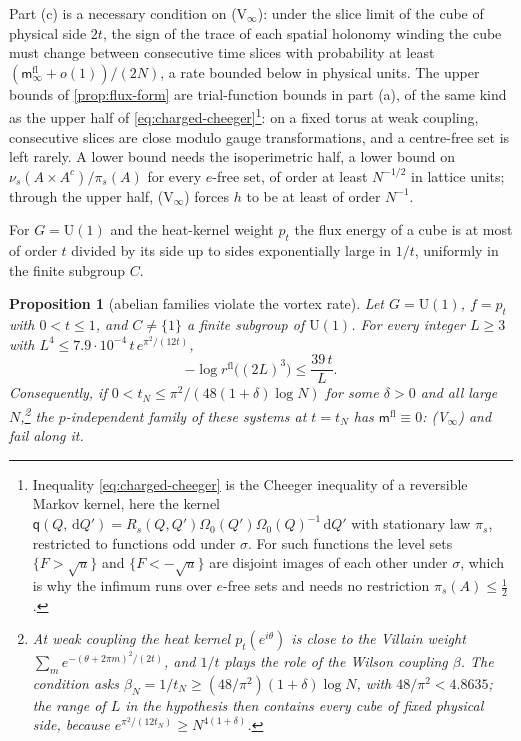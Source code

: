 \documentclass[11pt,a4paper]{amsart}
\newtheorem{proposition}[theorem]{Proposition}
\theoremstyle{definition}
\theoremstyle{remark}
\numberwithin{equation}{section}
\newcommand{\dd}{\,\mathrm{d}}             %
\newcommand{\U}{\mathrm{U}}                %
\newcommand{\cube}[1]{(2#1)^3}             %
\newcommand{\Omegazero}{\Omega_0}          %
\newcommand{\Mcirc}{\text{\upshape(M$^{\circ}$)}}   %
\begin{document}
Part (c) is a necessary condition on \textup{(V$_\infty$)}: under the slice limit of the cube of physical side $2t$, the sign of the trace of each spatial holonomy winding the cube must change between consecutive time slices with probability at least $(\mathsf m^{\mathrm{fl}}_\infty+o(1))/(2N)$, a rate bounded below in physical units. The upper bounds of \cref{prop:flux-form} are trial-function bounds in part (a), of the same kind as the upper half of \eqref{eq:charged-cheeger}\footnote{Inequality \eqref{eq:charged-cheeger} is the Cheeger inequality of a reversible Markov kernel, here the kernel $\mathsf q(Q,\dd Q')=R_s(Q,Q')\Omegazero(Q')\Omegazero(Q)^{-1}\dd Q'$ with stationary law $\pi_s$, restricted to functions odd under $\sigma$. For such functions the level sets $\{F>\sqrt u\}$ and $\{F<-\sqrt u\}$ are disjoint images of each other under $\sigma$, which is why the infimum runs over $e$-free sets and needs no restriction $\pi_s(A)\le\frac12$.}: on a fixed torus at weak coupling, consecutive slices are close modulo gauge transformations, and a centre-free set is left rarely. A lower bound needs the isoperimetric half, a lower bound on $\nu_s(A\times A^c)/\pi_s(A)$ for every $e$-free set, of order at least $N^{-1/2}$ in lattice units; through the upper half, \textup{(V$_\infty$)} forces $h$ to be at least of order $N^{-1}$.

For $G=\U(1)$ and the heat-kernel weight $p_t$ the flux energy of a cube is at most of order $t$ divided by its side up to sides exponentially large in $1/t$, uniformly in the finite subgroup $C$.

\begin{proposition}[abelian families violate the vortex rate]\label{prop:abelian-vortex}
Let $G=\U(1)$, $f=p_t$ with $0<t\le1$, and $C\ne\{1\}$ a finite subgroup of $\U(1)$. For every integer $L\ge3$ with $L^4\le7.9\cdot10^{-4}\,t\,e^{\pi^2/(12t)}$,
\[
-\log r^{\mathrm{fl}}\bigl(\cube L\bigr)\le\frac{39\,t}L .
\]
Consequently, if $0<t_N\le\pi^2/(48(1+\delta)\log N)$ for some $\delta>0$ and all large $N$,\footnote{At weak coupling the heat kernel $p_t(e^{i\theta})$ is close to the Villain weight $\sum_m e^{-(\theta+2\pi m)^2/(2t)}$, and $1/t$ plays the role of the Wilson coupling $\beta$. The condition asks $\beta_N=1/t_N\ge(48/\pi^2)(1+\delta)\log N$, with $48/\pi^2<4.8635$; the range of $L$ in the hypothesis then contains every cube of fixed physical side, because $e^{\pi^2/(12t_N)}\ge N^{4(1+\delta)}$.} the $p$-independent family of these systems at $t=t_N$ has $\mathsf m^{\mathrm{fl}}\equiv0$: \textup{(V$_\infty$)} and \Mcirc{} fail along it.
\end{proposition}
\end{document}
